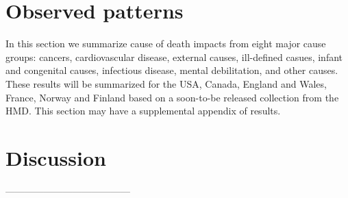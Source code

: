 \documentclass{article}
\begin{document}
\FloatBarrier

\section*{Observed patterns}
In this section we summarize cause of death impacts from eight
major cause groups: cancers, cardiovascular disease, external causes, ill-defined casues, infant and congenital causes, infectious disease, mental
debilitation, and other causes. These results will be summarized for the USA,
Canada, England and Wales, France, Norway and Finland based on a soon-to-be
released collection from the HMD. This section may have a supplemental appendix
of results.

\section*{Discussion}



% 
---------------------------------------

    
\end{document}
